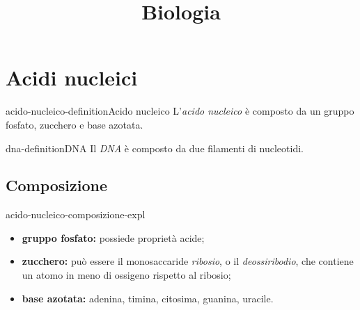 \documentclass[preview]{standalone}
\begin{document}
\title{Biologia}
\genpage

\section{Acidi nucleici}


\begin{snippetdefinition}{acido-nucleico-definition}{Acido nucleico}
    L'\textit{acido nucleico} è composto da un gruppo fosfato, zucchero e base azotata.
\end{snippetdefinition}

\begin{snippetdefinition}{dna-definition}{DNA}
    Il \textit{DNA} è composto da due filamenti di nucleotidi.
\end{snippetdefinition}

\subsection{Composizione}


\begin{snippet}{acido-nucleico-composizione-expl}
    \begin{itemize}
        \item \textbf{gruppo fosfato:} possiede proprietà acide;
        \item \textbf{zucchero:} può essere il monosaccaride \textit{ribosio}, o il \textit{deossiribodio},
            che contiene un atomo in meno di ossigeno rispetto al ribosio;
        \item \textbf{base azotata:} adenina, timina, citosima, guanina, uracile.
    \end{itemize}
\end{snippet}
\end{document}
